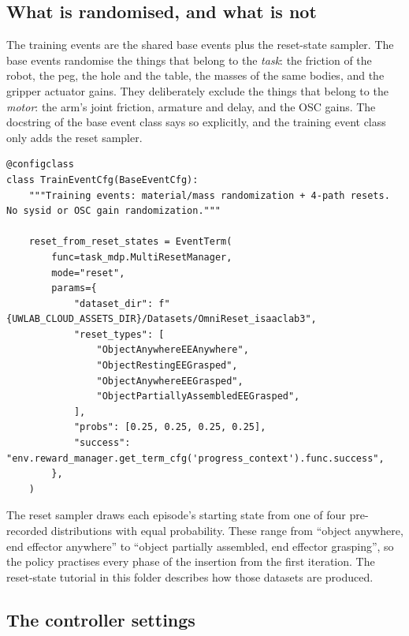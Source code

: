 \subsection{What is randomised, and what is not}

The training events are the shared base events plus the reset-state sampler. The base events randomise the things that belong to the \emph{task}: the friction of the robot, the peg, the hole and the table, the masses of the same bodies, and the gripper actuator gains. They deliberately exclude the things that belong to the \emph{motor}: the arm's joint friction, armature and delay, and the OSC gains. The docstring of the base event class says so explicitly, and the training event class only adds the reset sampler.

\begin{snippetbox}[11]
\begin{lstlisting}[firstnumber=237]
@configclass
class TrainEventCfg(BaseEventCfg):
    """Training events: material/mass randomization + 4-path resets. No sysid or OSC gain randomization."""

    reset_from_reset_states = EventTerm(
        func=task_mdp.MultiResetManager,
        mode="reset",
        params={
            "dataset_dir": f"{UWLAB_CLOUD_ASSETS_DIR}/Datasets/OmniReset_isaaclab3",
            "reset_types": [
                "ObjectAnywhereEEAnywhere",
                "ObjectRestingEEGrasped",
                "ObjectAnywhereEEGrasped",
                "ObjectPartiallyAssembledEEGrasped",
            ],
            "probs": [0.25, 0.25, 0.25, 0.25],
            "success": "env.reward_manager.get_term_cfg('progress_context').func.success",
        },
    )
\end{lstlisting}
\end{snippetbox}

The reset sampler draws each episode's starting state from one of four pre-recorded distributions with equal probability. These range from ``object anywhere, end effector anywhere'' to ``object partially assembled, end effector grasping'', so the policy practises every phase of the insertion from the first iteration. The reset-state tutorial in this folder describes how those datasets are produced.

\subsection{The controller settings}


